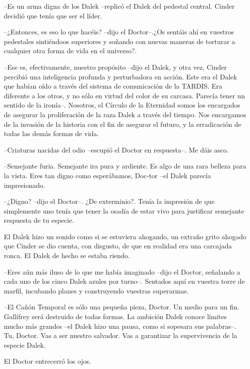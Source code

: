 --Es un arma digna de los Dalek --replicó el Dalek del pedestal central. Cinder decidió que tenía que ser el líder.

--¿Entonces, es eso lo que hacéis? --dijo el Doctor--.¿Os sentáis ahí en vuestros pedestales sintiéndoos superiores y soñando con nuevas maneras de torturar a cualquier otra forma de vida en el universo?.

--Ese es, efectivamente, nuestro propósito --dijo el Dalek, y otra vez, Cinder percibió una inteligencia profunda y perturbadora en acción. Este era el Dalek que habían oído a través del sistema de comunicación de la TARDIS. Era diferente a los otros, y no sólo en virtud del color de su carcasa. Parecía tener un sentido de la ironía--. Nosotros, el Círculo de la Eternidad somos los encargados de asegurar la proliferación de la raza Dalek a través del tiempo. Nos encargamos de la invasión de la historia con el fin de asegurar el futuro, y la erradicación de todas las demás formas de vida.

--Criaturas nacidas del odio --escupió el Doctor en respuesta--. Me dáis asco.

--Semejante furia. Semejante ira pura y ardiente. Es algo de una rara belleza para la vista. Eres tan digno como esperábamos, Doc-tor --el Dalek parecía impresionado.

--¿Digno? --dijo el Doctor--. ¿De exterminio?. Tenía la impresión de que simplemente uno tenía que tener la osadía de estar vivo para justificar semejante respuesta de tu especie.



El Dalek hizo un sonido como si se estuviera ahogando, un extraño grito ahogado que Cinder se dio cuenta, con disgusto, de que en realidad era una carcajada ronca. El Dalek de hecho se estaba riendo.



--Eres aún más iluso de lo que me había imaginado --dijo el Doctor, señalando a cada uno de los cinco Dalek azules por turno--. Sentados aquí en vuestra torre de marfil, incubando planes y construyendo vuestras superarmas.

--El Cañón Temporal es sólo una pequeña pieza, Doctor. Un medio para un fin. Gallifrey será destruido de todas formas. La ambición Dalek conoce límites mucho más grandes --el Dalek hizo una pausa, como si sopesara sus palabras--. Tu, Doctor. Vas a ser nuestro salvador. Vas a garantizar la supervivencia de la especie Dalek.



El Doctor entrecerró los ojos. 



